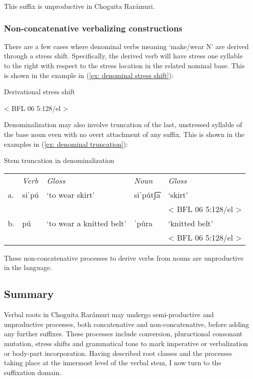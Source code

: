 This suffix is unproductive in Choguita Rarámuri.

\subsubsection{Non-concatenative verbalizing constructions}
\label{subsubsec: non-concatenative verbalizing constructions}

There are a few cases where denominal verbs meaning ‘make/wear N’ are derived through a stress shift. Specifically, the derived verb will have stress one syllable to the right with respect to the stress location in the related nominal base. This is shown in the example in (\ref{ex: denominal stress shift}):

\ea\label{ex: denominal stress shift}
{Derivational stress shift}

    {< BFL 06 5:128/el >} \\
    \z
\z

Denominalization may also involve truncation of the last, unstressed syllable of the base noun even with no overt attachment of any suffix. This is shown in the examples in (\ref{ex: denominal truncation}):

\ea\label{ex: denominal truncation}
{Stem truncation in denominalization}

\begin{tabular}{lllll}
      & \textit{Verb} & \textit{Gloss} & \textit{Noun} & \textit{Gloss} \\
    a.& {siˈpú}&{‘to wear skirt’}& {siˈpútʃ͡a}& {‘skirt'}\\
    & & & & {< BFL 06 5:128/el >}\\
    b.& {pú}&{‘to wear a knitted belt’}& {ˈpúra} &‘{knitted belt’} \\
    & & & & {< BFL 06 5:128/el >}\\
\end{tabular}
\z

These non-concatenative processes to derive verbs from nouns are unproductive in the language.

\subsection{Summary}
\label{subsec:9:summary}

Verbal roots in Choguita Rarámuri may undergo semi-productive and unproductive processes, both concatenative and non-concatenative, before adding any further suffixes. These processes include conversion, pluractional consonant mutation, stress shifts and grammatical tone to mark imperative or verbalization or body-part incorporation. Having described root classes and the processes taking place at the innermost level of the verbal stem, I now turn to the suffixation domain.

